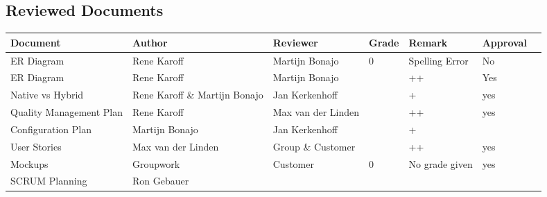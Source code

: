 \begin{landscape}
	\section*{Reviewed Documents}
	\begin{longtable}[htbp]{ l l l l l l l }
		\textbf{Document} & \textbf{Author} & \textbf{Reviewer} & \textbf{Grade} & Remark & \textbf{Approval}\\ \hline
		ER Diagram & Rene Karoff & Martijn Bonajo & 0 & Spelling Error& No\\
		ER Diagram & Rene Karoff & Martijn Bonajo && ++ & Yes\\
		Native vs Hybrid & Rene Karoff \& Martijn Bonajo & Jan Kerkenhoff && + & yes\\
		Quality Management Plan & Rene Karoff & Max van der Linden && ++ & yes \\
		Configuration Plan & Martijn Bonajo & Jan Kerkenhoff && + & \\
		User Stories & Max van der Linden & Group \& Customer & & ++ & yes \\
		Mockups & Groupwork & Customer & 0 & No grade given &  yes\\
		SCRUM Planning & Ron Gebauer & & & & \\
	\end{longtable}
\end{landscape}

